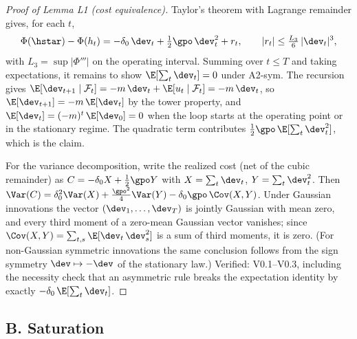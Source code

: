 \documentclass[11pt]{article}
\begin{document}
\begin{proof}[Proof of Lemma L1 (cost equivalence)]
Taylor's theorem with Lagrange remainder gives, for each $t$,
\[
\Phi(\hstar) - \Phi(h_t)
 = -\delta_0\,\dev_t + \tfrac{1}{2}\gpo\,\dev_t^2 + r_t,
 \qquad |r_t| \le \tfrac{L_3}{6}\,|\dev_t|^3,
\]
with $L_3 = \sup |\Phi'''|$ on the operating interval. Summing over
$t \le T$ and taking expectations, it remains to show
$\E[\sum_t \dev_t] = 0$ under A2-sym. The recursion gives
$\E[\dev_{t+1} \mid \mathcal{F}_t] = -m\,\dev_t + \E[u_t \mid \mathcal{F}_t]
= -m\,\dev_t$, so $\E[\dev_{t+1}] = -m\,\E[\dev_t]$ by the tower property,
and $\E[\dev_t] = (-m)^t\,\E[\dev_0] = 0$ when the loop starts at the
operating point or in the stationary regime. The quadratic term contributes
$\tfrac{1}{2}\gpo\,\E[\sum_t \dev_t^2]$, which is the claim.

For the variance decomposition, write the realized cost (net of the cubic
remainder) as $C = -\delta_0 X + \tfrac{1}{2}\gpo Y$ with
$X = \sum_t \dev_t$, $Y = \sum_t \dev_t^2$. Then
$\Var(C) = \delta_0^2 \Var(X) + \tfrac{\gpo^2}{4}\Var(Y)
- \delta_0\gpo\,\Cov(X, Y)$. Under Gaussian innovations the vector
$(\dev_1,\dots,\dev_T)$ is jointly Gaussian with mean zero, and every third
moment of a zero-mean Gaussian vector vanishes; since
$\Cov(X,Y) = \sum_{t,s}\E[\dev_t\,\dev_s^2]$ is a sum of third moments, it is
zero. (For non-Gaussian symmetric innovations the same conclusion follows
from the sign symmetry $\dev \mapsto -\dev$ of the stationary law.)
Verified: V0.1--V0.3, including the necessity check that an asymmetric rule
breaks the expectation identity by exactly $-\delta_0\,\E[\sum_t \dev_t]$.
\end{proof}

\subsection*{B. Saturation}
\end{document}

